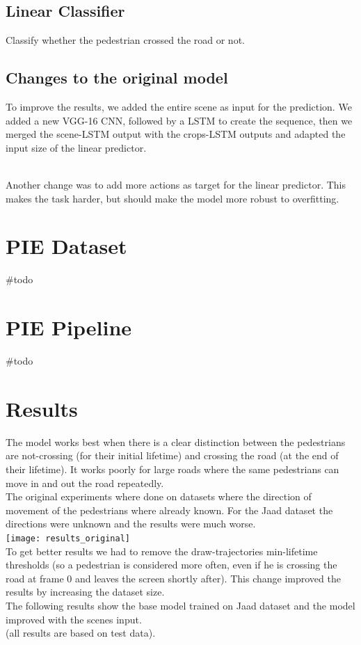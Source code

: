 \documentclass[11pt]{article}
\begin{document}
\subsection*{Linear Classifier}
Classify whether the pedestrian crossed the road or not.

\subsection*{Changes to the original model}
To improve the results, we added the entire scene as input for the prediction.
We added a new VGG-16 CNN, followed by a LSTM to create the sequence, then we merged the scene-LSTM output with the crops-LSTM
outputs and adapted the input size of the linear predictor.

\\
Another change was to add more actions as target for the linear predictor.
This makes the task harder, but should make the model more robust to overfitting.


\section{PIE Dataset}
\#todo

\section{PIE Pipeline}
\#todo


\section{Results}
    The model works best when there is a clear distinction between the pedestrians are not-crossing (for their initial lifetime)
    and crossing the road (at the end of their lifetime).
    It works poorly for large roads where the same pedestrians can move in and out the road repeatedly.\\
    The original experiments where done on datasets where the direction of movement of the pedestrians where already known.
    For the Jaad dataset the directions were unknown and the results were much worse.\\
    \texttt{[image: results\_original]}\\
    To get better results we had to remove the draw-trajectories min-lifetime thresholds (so a pedestrian is considered more often, even if he
    is crossing the road at frame 0 and leaves the screen shortly after).
    This change improved the results by increasing the dataset size.\\
    The following results show the base model trained on Jaad dataset and the model improved with the scenes input.\\
    (all results are based on test data).
\end{document}
